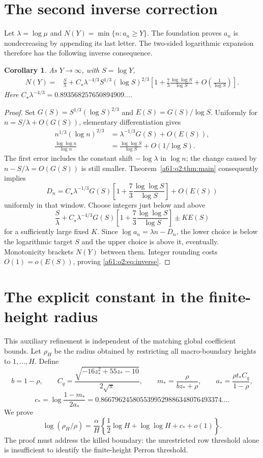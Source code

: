 \documentclass[11pt,letterpaper]{article}
\numberwithin{equation}{section}
\newtheorem{corollary}[theorem]{Corollary}
\theoremstyle{remark}\newtheorem{remark}[theorem]{Remark}
\newcommand{\st}{\star}
\begin{document}
\section{The second inverse correction}
Let $\lambda=\log\mu$ and $N(Y)=\min\{n:a_n\ge Y\}$. The foundation proves $a_n$ is nondecreasing by appending its last letter. The two-sided logarithmic expansion therefore has the following inverse consequence.
\begin{corollary}\label{a61:o2:cor:inverse}
As $Y\to\infty$, with $S=\log Y$,
\begin{align}\label{a61:o2:eq:inverse}
 N(Y)={}&\frac S\lambda
 +C_\st\lambda^{-4/3}S^{1/3}(\log S)^{2/3}
 \left[1+\frac73\frac{\log\log S}{\log S}
                 +O\!\left(\frac1{\log S}\right)\right].
\end{align}
Here $C_\st\lambda^{-4/3}=0.893568257650894909\ldots$.
\end{corollary}
\begin{proof}
Set $G(S)=S^{1/3}(\log S)^{2/3}$ and $E(S)=G(S)/\log S$.
Uniformly for $n=S/\lambda+O(G(S))$, elementary differentiation gives
\begin{align*}
 n^{1/3}(\log n)^{2/3}
   &=\lambda^{-1/3}G(S)+O(E(S)),\\
 \frac{\log\log n}{\log n}
   &=\frac{\log\log S}{\log S}+O(1/\log S).
\end{align*}
The first error includes the constant shift $-\log\lambda$ in $\log n$; the change caused by $n-S/\lambda=O(G(S))$ is still smaller. Theorem~\ref{a61:o2:thm:main} consequently implies
\[
 D_n=C_\st\lambda^{-1/3}G(S)
       \left[1+\frac73\frac{\log\log S}{\log S}\right]+O(E(S))
\]
uniformly in that window. Choose integers just below and above
\[
 \frac S\lambda+C_\st\lambda^{-4/3}G(S)
       \left[1+\frac73\frac{\log\log S}{\log S}\right]
       \pm K E(S)
\]
for a sufficiently large fixed $K$. Since $\log a_n=\lambda n-D_n$, the lower choice is below the logarithmic target $S$ and the upper choice is above it, eventually. Monotonicity brackets $N(Y)$ between them. Integer rounding costs $O(1)=o(E(S))$, proving \eqref{a61:o2:eq:inverse}.
\end{proof}

\section{The explicit constant in the finite-height radius}
\label{a61:o2:rad:section}

This auxiliary refinement is independent of the matching global
coefficient bounds. Let $\rho_H$ be the radius obtained by restricting
all macro-boundary heights to $1,\ldots,H$. Define
\[
 b=1-\rho,\qquad
 C_q=\frac{\sqrt{-16z_*^2+55z_*-10}}{2\sqrt\pi},\qquad
 m_*=\frac{\rho}{bz_*+\rho},\qquad
 a_*=\frac{\rho t_*C_q}{1-\rho},
\]
\[
 c_*=\log\frac{1-m_*}{2a_*}
 =0.8667962458055399529886348076493374\ldots.
\]
We prove
\begin{equation}\label{a61:o2:rad:theorem}
 \log(\rho_H/\rho)
  =\frac\alpha H\left\{\frac12\log H+\log\log H
                          +c_*+o(1)\right\}.
\end{equation}
The proof must address the killed boundary: the unrestricted row
threshold alone is insufficient to identify the finite-height Perron
threshold.
\end{document}
